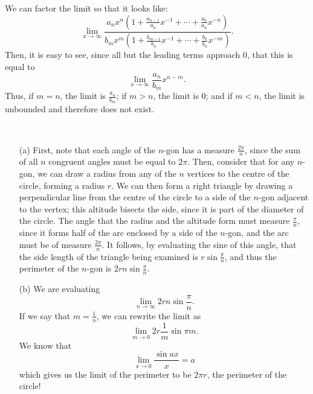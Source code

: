 \begin{problem}[5-32]
We can factor the limit so that it looks like:
\[ \lim_{x \to \infty} \frac{a_nx^n(1 + \frac{a_{n-1}}{a_n}x^{-1} + \cdots + \frac{a_0}{a_n}x^{-n})}{b_mx^m(1 + \frac{b_{m-1}}{b_n}x^{-1} + \cdots + \frac{b_0}{b_n}x^{-m})}. \]
Then, it is easy to see, since all but the leading terms approach 0, that this is equal to
\[ \lim_{x \to \infty} \frac{a_n}{b_m}x^{n - m}. \]
Thus, if $m = n$, the limit is $\frac{a_n}{b_m}$; if $m > n$, the limit is 0; and if $m < n$, the limit is unbounded and therefore does not exist.
\end{problem}

\begin{problem}[5-40] \ 
\begin{enumerate}
\item[(a)]
First, note that each angle of the $n$-gon has a measure $\frac{2\pi}{n}$, since the sum of all $n$ congruent angles must be equal to $2\pi$. Then, consider that for any $n$-gon, we can draw a radius from any of the $n$ vertices to the centre of the circle, forming a radius $r$. We can then form a right triangle by drawing a perpendicular line from the centre of the circle to a side of the $n$-gon adjacent to the vertex; this altitude bisects the side, since it is part of the diameter of the circle. The angle that the radius and the altitude form must measure $\frac{\pi}{n}$, since it forms half of the arc enclosed by a side of the $n$-gon, and the arc must be of measure $\frac{2\pi}{n}$. It follows, by evaluating the sine of this angle, that the side length of the triangle being examined is $r \sin\frac{\pi}{n}$, and thus the perimeter of the $n$-gon is $2rn \sin \frac{\pi}{n}$.

\item[(b)]
We are evaluating 
\[ \lim_{n \to \infty} 2rn \sin \frac{\pi}{n}. \]
If we say that $m = \frac{1}{n}$, we can rewrite the limit as
\[ \lim_{m \to 0} 2r\frac{1}{m} \sin \pi m. \]
We know that 
\[ \lim_{x \to 0} \frac{\sin ax}{x} = a \]
which gives us the limit of the perimeter to be $2\pi r$, the perimeter of the circle!
\end{enumerate}
\end{problem}

